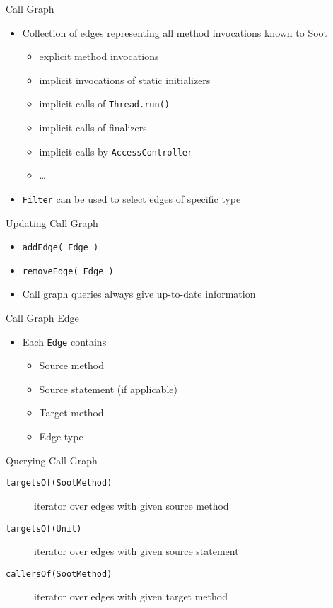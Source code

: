 \begin{slide}{Call Graph}
\begin{itemize}
\item Collection of edges representing {\red all} method invocations known to Soot
\begin{itemize}
\item explicit method invocations
\item implicit invocations of static initializers
\item implicit calls of {\tt Thread.run()}
\item implicit calls of finalizers
\item implicit calls by {\tt AccessController}
\item \ldots
\end{itemize}
\item {\tt Filter} can be used to select edges of specific type
\end{itemize}
\end{slide}

\begin{slide}{Updating Call Graph}
\begin{itemize}
\item {\tt addEdge( Edge )}
\item {\tt removeEdge( Edge )}
\item Call graph queries always give up-to-date information
\end{itemize}
\end{slide}


\begin{slide}{Call Graph Edge}
\begin{itemize}
\item Each {\tt Edge} contains
\begin{itemize}
\item Source method
\item Source statement (if applicable)
\item Target method
\item Edge type
\end{itemize}
\end{itemize}
\end{slide}

\begin{slide}{Querying Call Graph}
\begin{description}
\item[\tt targetsOf(SootMethod)] iterator over edges with given source method
\item[\tt targetsOf(Unit)] iterator over edges with given source statement
\item[\tt callersOf(SootMethod)] iterator over edges with given target method
\end{description}
\end{slide}

